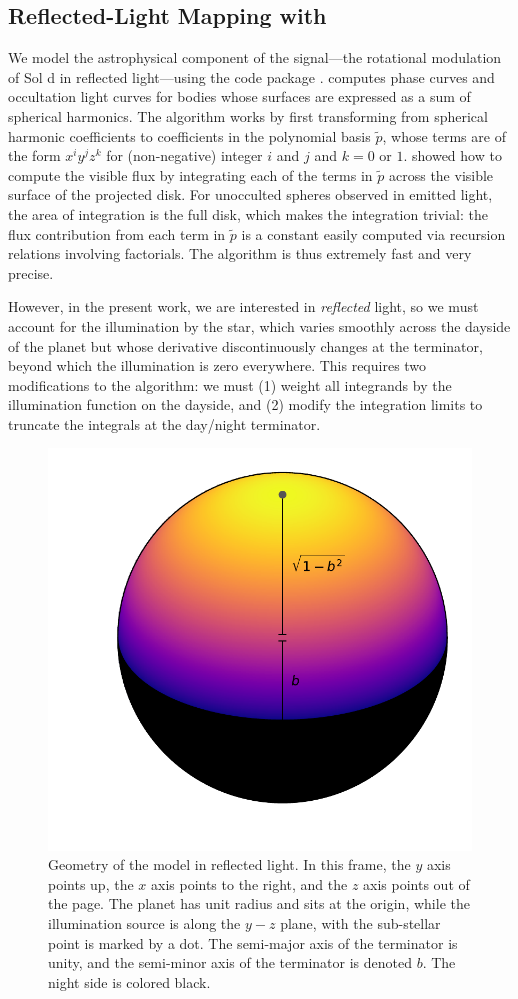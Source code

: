 \documentclass[modern]{aastex62}
\begin{document}
\subsection{Reflected-Light Mapping with \starry}
\label{sec:starry}

We model the astrophysical component of the signal---the rotational modulation
of Sol d in reflected light---using the \starry code package \citep{Luger2019}.
\starry computes phase curves and occultation light curves for bodies whose
surfaces are expressed as a sum of spherical harmonics. 
The algorithm works by first transforming
from spherical harmonic coefficients to coefficients in the polynomial basis $\tilde{p}$, whose
terms are of the form $x^i y^j z^k$ for (non-negative) integer $i$ and $j$ 
and $k = 0$ or $1$. \citet{Luger2019} showed how to compute the visible
flux by integrating each of the terms in $\tilde{p}$ across the visible
surface of the projected disk. For unocculted spheres observed in emitted
light, the area of integration is the full disk, which makes the integration
trivial: the flux contribution from each term in $\tilde{p}$ is a constant
easily computed via recursion relations involving factorials. The algorithm is
thus extremely fast and very precise.

However, in the present work, we are interested in \emph{reflected} light, so we must
account for the illumination by the star, which varies smoothly
across the dayside of the planet but whose derivative discontinuously changes at the 
terminator, beyond which the illumination is zero everywhere. This requires
two modifications to the \starry algorithm: we must (1) weight all integrands
by the illumination function on the dayside, and (2) modify the integration
limits to truncate the integrals at the day/night terminator.

\begin{figure}[ht!]
    \begin{centering}
    \includegraphics[width=0.4\linewidth]{figures/geometry.pdf}
    \caption{\label{fig:geometry}
             Geometry of the \starry model in reflected light. In this frame, 
             the $y$ axis points up, 
             the $x$ axis points to the right, and the $z$ axis points out of the page.
             The planet has unit radius and sits at the origin, while
             the illumination source is along the $y-z$ plane, with the sub-stellar point is
             marked by a dot. The semi-major axis of the terminator is unity, and
             the semi-minor axis of the terminator is denoted $b$. The night side
             is colored black.
             }
    \end{centering}
\end{figure}
\end{document}
